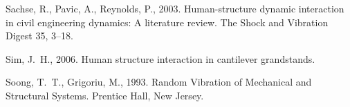 \documentclass[preprint,12pt,authoryear]{elsarticle}
\begin{document}
\begin{thebibliography}{11}
	Sachse, R., Pavic, A., Reynolds, P., 2003. Human-structure dynamic interaction
	in civil engineering dynamics: A literature review. The Shock and Vibration
	Digest 35, 3--18.
	
	Sim, J.~H., 2006. Human structure interaction in cantilever grandstands.
	
	Soong, T.~T., Grigoriu, M., 1993. Random Vibration of Mechanical and Structural
	Systems. Prentice Hall, New Jersey.
	
\end{thebibliography}
\end{document}
